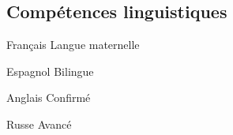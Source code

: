 \documentclass[30pt]{tccv}
\begin{document}
\begin{upshape}
\begin{education}
\end{education}


%
%


\begin{competence}


\section{Compétences linguistiques}
\fontsize{15pt}{1.6em}\color{text}\bodyfontlight\upshape\selectfont %
\begin{factlist}
\item{Français} {Langue maternelle}	
\item{Espagnol} {Bilingue}	
\item{Anglais} {Confirmé}	
\item{Russe} {Avancé}
\end{factlist}

\fontsize{10pt}{1.1em}\color{text}\bodyfontlight\upshape\selectfont %






\end{competence}




%
%


\begin{experience}


\end{experience}
\end{upshape}
\end{document}
